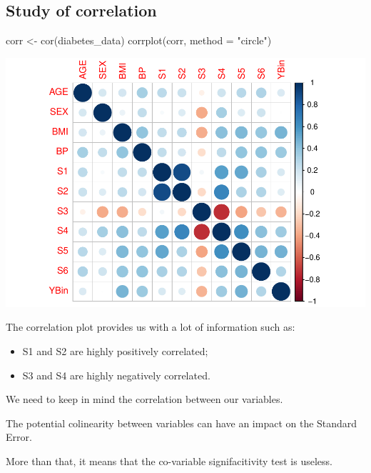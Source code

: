 \documentclass[
]{article}
\newenvironment{Shaded}{\begin{snugshade}}{\end{snugshade}}
\newcommand{\AttributeTok}[1]{\textcolor[rgb]{0.77,0.63,0.00}{#1}}
\newcommand{\FunctionTok}[1]{\textcolor[rgb]{0.00,0.00,0.00}{#1}}
\newcommand{\NormalTok}[1]{#1}
\newcommand{\OtherTok}[1]{\textcolor[rgb]{0.56,0.35,0.01}{#1}}
\newcommand{\StringTok}[1]{\textcolor[rgb]{0.31,0.60,0.02}{#1}}
\begin{document}
\hypertarget{study-of-correlation}{%
\subsection{Study of correlation}\label{study-of-correlation}}

\begin{Shaded}
\begin{Highlighting}[]
\NormalTok{corr }\OtherTok{\textless{}{-}} \FunctionTok{cor}\NormalTok{(diabetes\_data)}
\FunctionTok{corrplot}\NormalTok{(corr, }\AttributeTok{method =} \StringTok{"circle"}\NormalTok{)}
\end{Highlighting}
\end{Shaded}

\begin{center}\includegraphics{TP3_MERR_HABBOU_KHIDOUR_files/figure-latex/unnamed-chunk-5-1} \end{center}

The correlation plot provides us with a lot of information such as:

\begin{itemize}
\item
  S1 and S2 are highly positively correlated;
\item
  S3 and S4 are highly negatively correlated.
\end{itemize}

We need to keep in mind the correlation between our variables.

The potential colinearity between variables can have an impact on the
Standard Error.

More than that, it means that the co-variable signifacitivity test is
useless.
\end{document}

